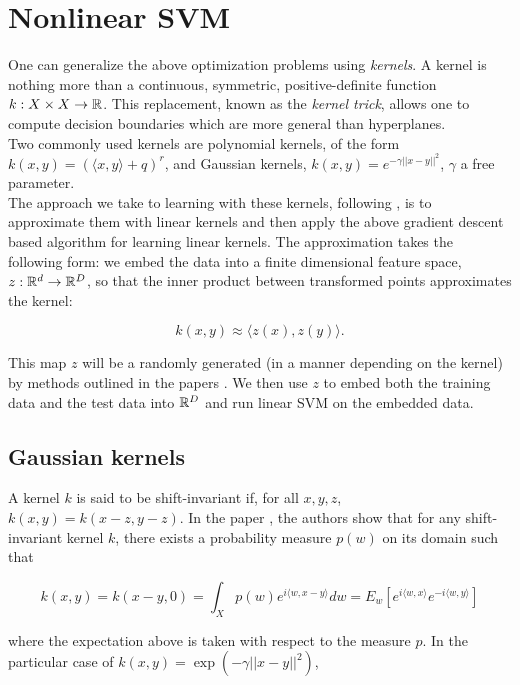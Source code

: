 \section{Nonlinear SVM}\label{sec:nonlinear}

One can generalize the above optimization problems using \textit{kernels}. A kernel is nothing more than a continuous, symmetric, positive-definite function $k:X\times X \to \mathbb{R}$. This replacement, known as the \textit{kernel trick}, allows one to compute decision boundaries which are more general than hyperplanes. \\



Two commonly used kernels are polynomial kernels, of the form $k(x,y) = (\langle x,y\rangle +q)^r$, and Gaussian kernels, $k(x,y) = e^{-\gamma||x-y||^2}$, $\gamma$ a free parameter.\\ 

The approach we take to learning with these kernels, following \cite{RR07}, is to approximate them with linear kernels and then apply the above gradient descent based algorithm for learning linear kernels. The approximation takes the following form: we embed the data into a finite dimensional feature space, $z:\mathbb{R}^d\to \mathbb{R}^D$, so that the inner product between transformed points approximates the kernel:

\[ k(x,y) \approx \langle z(x), z(y)\rangle.\]

This map $z$ will be a randomly generated (in a manner depending on the kernel) by methods outlined in the papers \cite{KK12,RR07}. We then use $z$ to embed both the training data and the test data into $\mathbb{R}^D$ and run linear SVM on the embedded data.\\

\subsection{Gaussian kernels}

A kernel $k$ is said to be shift-invariant if, for all $x,y,z$, $k(x,y) = k(x-z,y-z)$. In the paper \cite{RR07}, the authors show that for any shift-invariant kernel $k$, there exists a probability measure $p(w)$ on its domain such that

\[ k(x,y) = k(x-y,0) = \int_X p(w)e^{i\langle w, x-y\rangle} dw = E_w[e^{i\langle w,x\rangle}e^{-i\langle w,y\rangle}]
\]

where the expectation above is taken with respect to the measure $p$. In the particular case of $k(x,y) = \exp(-\gamma||x-y||^2)$,

